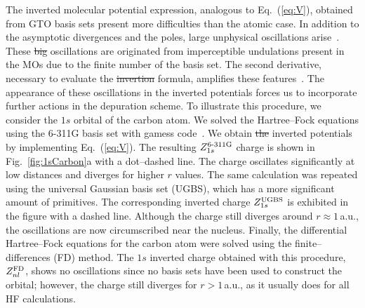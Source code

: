 \documentclass[10pt]{article}
\providecommand{\DIFaddtex}[1]{{\protect\color{blue}\uwave{#1}}} %
\providecommand{\DIFdeltex}[1]{{\protect\color{red}\sout{#1}}}                      %
\providecommand{\DIFaddbegin}{} %
\providecommand{\DIFaddend}{} %
\providecommand{\DIFdelbegin}{} %
\providecommand{\DIFdelend}{} %
\providecommand{\DIFadd}[1]{\texorpdfstring{\DIFaddtex{#1}}{#1}} %
\providecommand{\DIFdel}[1]{\texorpdfstring{\DIFdeltex{#1}}{}} %
\newcommand{\DIFscaledelfig}{0.5}
\newlength{\DIFdelgraphicswidth} %
\newlength{\DIFdelgraphicsheight} %
\newcommand{\DIFaddincludegraphics}[2][]{{\color{blue}\fbox{\DIFOincludegraphics[#1]{#2}}}} %
\newcommand{\DIFdelincludegraphics}[2][]{%
\sbox{\DIFdelgraphicsbox}{\DIFOincludegraphics[#1]{#2}}%
\settoboxwidth{\DIFdelgraphicswidth}{\DIFdelgraphicsbox} %
\settoboxtotalheight{\DIFdelgraphicsheight}{\DIFdelgraphicsbox} %
\scalebox{\DIFscaledelfig}{%
\parbox[b]{\DIFdelgraphicswidth}{\usebox{\DIFdelgraphicsbox}\\[-\baselineskip] \rule{\DIFdelgraphicswidth}{0em}}\llap{\resizebox{\DIFdelgraphicswidth}{\DIFdelgraphicsheight}{%
\setlength{\unitlength}{\DIFdelgraphicswidth}%
\begin{picture}(1,1)%
\thicklines\linethickness{2pt} %
{\color[rgb]{1,0,0}\put(0,0){\framebox(1,1){}}}%
{\color[rgb]{1,0,0}\put(0,0){\line( 1,1){1}}}%
{\color[rgb]{1,0,0}\put(0,1){\line(1,-1){1}}}%
\end{picture}%
}\hspace*{3pt}}} %
} %
\DeclareRobustCommand{\DIFaddbegin}{\DIFOaddbegin \let\includegraphics\DIFaddincludegraphics} %
\DeclareRobustCommand{\DIFaddend}{\DIFOaddend \let\includegraphics\DIFOincludegraphics} %
\DeclareRobustCommand{\DIFdelbegin}{\DIFOdelbegin \let\includegraphics\DIFdelincludegraphics} %
\DeclareRobustCommand{\DIFdelend}{\DIFOaddend \let\includegraphics\DIFOincludegraphics} %
\begin{document}
The inverted molecular potential expression, analogous 
to Eq.~(\ref{eq:V}), obtained from GTO basis sets present more difficulties
than the atomic case. In addition to the asymptotic divergences and
the poles, large unphysical 
oscillations arise~\cite{Schipper1997,Mura1997,Jacob2011,Gaiduk2013}. 
These \DIFdelbegin \DIFdel{big }\DIFdelend \DIFaddbegin \DIFadd{prominent }\DIFaddend oscillations are originated from imperceptible undulations 
present in the MOs due to the finite number of the basis set. The
second derivative, necessary to evaluate the \DIFdelbegin \DIFdel{invertion }\DIFdelend \DIFaddbegin \DIFadd{inversion }\DIFaddend formula, amplifies
these features~\cite{Schipper1997,Gaiduk2013}.
The appearance of these oscillations in the inverted potentials forces us to
incorporate further actions in the depuration scheme. To illustrate 
this procedure, we consider the $1s$ orbital of the carbon atom. 
We solved the Hartree--Fock equations using the \mbox{6-311G} basis set 
with {\sc gamess} code~\cite{Schmidt1993,Gordon2005}.
We obtain \DIFdelbegin \DIFdel{the }\DIFdelend inverted potentials by implementing Eq.~(\ref{eq:V}). 
The resulting $Z_{1s}^{\mbox{\scriptsize 6-311G}}$ charge is shown in 
Fig.~\ref{fig:1sCarbon}a with a dot--dashed line. 
The charge oscillates significantly at low distances and diverges for 
higher $r$ values. The same calculation was 
repeated using the universal Gaussian basis set (UGBS), which has a 
more significant amount of primitives. The corresponding inverted 
charge $Z_{1s}^{\mbox{\scriptsize UGBS}}$ is exhibited in the figure 
with a dashed line. 
Although the charge still diverges around $r\approx1\,$a.u., the 
oscillations are now circumscribed near the nucleus.
Finally, the differential Hartree--Fock equations for the carbon 
atom were solved using the finite--differences (FD) method. 
The $1s$ inverted charge obtained with this procedure, 
$Z_{nl}^{\mbox{\scriptsize FD}}$, shows no oscillations since no basis 
sets have 
been used to construct the orbital; however, the charge still 
diverges for $r>1\,$a.u., as it usually does for all HF calculations.
\end{document}
